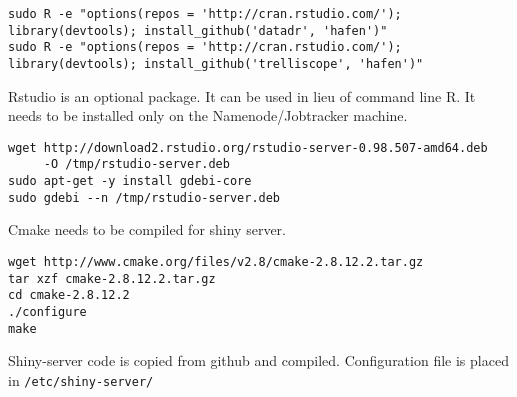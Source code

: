 \documentclass[11pt]{article}
\begin{document}
\begin{verbatim}
sudo R -e "options(repos = 'http://cran.rstudio.com/');
library(devtools); install_github('datadr', 'hafen')"
sudo R -e "options(repos = 'http://cran.rstudio.com/');
library(devtools); install_github('trelliscope', 'hafen')"
\end{verbatim}


Rstudio is an optional package. It can be used in lieu of command line
R. It needs to be installed only on the Namenode/Jobtracker machine.

\begin{verbatim}
wget http://download2.rstudio.org/rstudio-server-0.98.507-amd64.deb
     -O /tmp/rstudio-server.deb
sudo apt-get -y install gdebi-core
sudo gdebi --n /tmp/rstudio-server.deb
\end{verbatim}


Cmake needs to be compiled for shiny server.

\begin{verbatim}
wget http://www.cmake.org/files/v2.8/cmake-2.8.12.2.tar.gz
tar xzf cmake-2.8.12.2.tar.gz
cd cmake-2.8.12.2
./configure
make
\end{verbatim}

Shiny-server code is copied from github and compiled. Configuration file
is placed in \texttt{/etc/shiny-server/}
\end{document}
